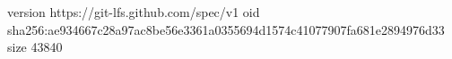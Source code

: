 version https://git-lfs.github.com/spec/v1
oid sha256:ae934667c28a97ac8be56e3361a0355694d1574c41077907fa681e2894976d33
size 43840
